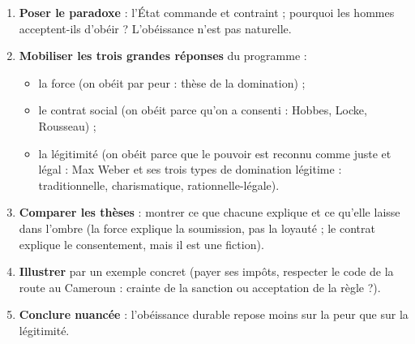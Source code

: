 \documentclass[11pt]{article}
\newcommand{\cle}[1]{{\popxbold\color{popdark}#1}}
\begin{document}
\begin{methode}
\begin{enumerate}
\item \textbf{Poser le paradoxe} : l'État commande et contraint ; pourquoi les hommes acceptent-ils d'obéir ? L'obéissance n'est pas naturelle.
\item \textbf{Mobiliser les trois grandes réponses} du programme :
\begin{itemize}
\item la \cle{force} (on obéit par peur : thèse de la domination) ;
\item le \cle{contrat social} (on obéit parce qu'on a consenti : Hobbes, Locke, Rousseau) ;
\item la \cle{légitimité} (on obéit parce que le pouvoir est reconnu comme juste et légal : Max Weber et ses trois types de domination légitime : traditionnelle, charismatique, rationnelle-légale).
\end{itemize}
\item \textbf{Comparer les thèses} : montrer ce que chacune explique et ce qu'elle laisse dans l'ombre (la force explique la soumission, pas la loyauté ; le contrat explique le consentement, mais il est une fiction).
\item \textbf{Illustrer} par un exemple concret (payer ses impôts, respecter le code de la route au Cameroun : crainte de la sanction ou acceptation de la règle ?).
\item \textbf{Conclure nuancée} : l'obéissance durable repose moins sur la peur que sur la légitimité.
\end{enumerate}
\end{methode}
\end{document}
